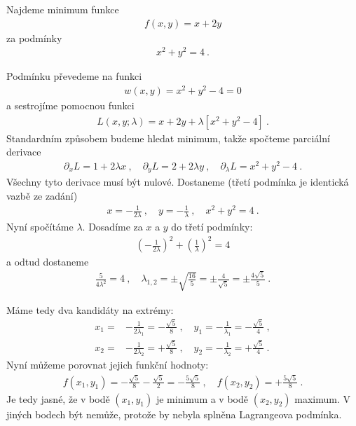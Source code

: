 \begin{example}
    Najdeme minimum funkce \begin{align}
        f(x,y) = x+2y
    \end{align}
    za podmínky
    \begin{align}
        x^2 + y^2 = 4 \:.
    \end{align}

    Podmínku převedeme na funkci \begin{align}
        w(x,y) = x^2 + y^2 - 4 = 0
    \end{align}
    a sestrojíme pomocnou funkci
    \begin{align}
        L(x,y;\lambda) = x + 2 y + \lambda [x^2 + y^2 - 4] \:.
    \end{align}
    Standardním způsobem budeme hledat minimum, takže spočteme parciální derivace
    \begin{align}
        \partial_x L = 1 + 2 \lambda x \:, \quad \partial_y L = 2 + 2 \lambda y \:, \quad \partial_\lambda L = x^2 + y^2 - 4 \:.
    \end{align}
    Všechny tyto derivace musí být nulové. Dostaneme (třetí podmínka je identická vazbě ze zadání)\begin{align}
        x = - \frac{1}{2 \lambda} \:, \quad y = - \frac{1}{\lambda} \:, \quad x^2 + y^2 = 4 \:.
    \end{align}
    Nyní spočítáme $\lambda$. Dosadíme za $x$ a $y$ do třetí podmínky:
    \begin{align}
        \left( -\frac{1}{2 \lambda }\right)^2 + \left( \frac{1}{\lambda }\right)^2 = 4
    \end{align}
    a odtud dostaneme
    \begin{align}
        \frac{5}{4 \lambda^2} = 4 \:, \quad \lambda_{1,2} = \pm \sqrt{\frac{16}{5}} = \pm \frac{4}{\sqrt{5}} = \pm \frac{4 \sqrt{5}}{5} \:.
    \end{align}

    Máme tedy dva kandidáty na extrémy:
    \begin{align}
        x_1 =& -\frac{1}{2 \lambda_1} = - \frac{\sqrt{5}}{8} \:, \quad
        y_1 = -\frac{1}{\lambda_1} = - \frac{\sqrt{5}}{4} \:, \\
        x_2 =& -\frac{1}{2 \lambda_2} = + \frac{\sqrt{5}}{8} \:, \quad
        y_2 = -\frac{1}{\lambda_2} = + \frac{\sqrt{5}}{4} \:.
    \end{align}
    Nyní můžeme porovnat jejich funkční hodnoty:
    \begin{align}
        f(x_1,y_1) = - \frac{\sqrt{5}}{8} - \frac{\sqrt{5}}{2} = - \frac{5\sqrt{5}}{8} \:, \quad f(x_2,y_2) = + \frac{5\sqrt{5}}{8} \:.
    \end{align}
    Je tedy jasné, že v bodě $(x_1,y_1)$ je minimum a v bodě $(x_2,y_2)$ maximum. V jiných bodech být nemůže, protože by nebyla splněna Lagrangeova podmínka.
\end{example}

